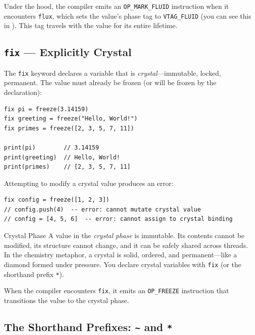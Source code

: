 Under the hood, the compiler emits an \lstinline|OP_MARK_FLUID| instruction when it encounters \lstinline|flux|, which sets the value's phase tag to \lstinline|VTAG_FLUID| (you can see this in ).
This tag travels with the value for its entire lifetime.

\subsection{\texttt{fix} --- Explicitly Crystal}\label{subsec:fix}

The \lstinline|fix| keyword declares a variable that is \emph{crystal}---immutable, locked, permanent.
The value must already be frozen (or will be frozen by the declaration):

\begin{lstlisting}[language=Lattice, caption={Declaring immutable variables with fix}]
fix pi = freeze(3.14159)
fix greeting = freeze("Hello, World!")
fix primes = freeze([2, 3, 5, 7, 11])

print(pi)        // 3.14159
print(greeting)  // Hello, World!
print(primes)    // [2, 3, 5, 7, 11]
\end{lstlisting}

Attempting to modify a crystal value produces an error:

\begin{lstlisting}[language=Lattice, caption={Crystal values reject modification}]
fix config = freeze([1, 2, 3])
// config.push(4)  -- error: cannot mutate crystal value
// config = [4, 5, 6]  -- error: cannot assign to crystal binding
\end{lstlisting}

\begin{defnbox}{Crystal Phase}
A value in the \emph{crystal phase} is immutable.
Its contents cannot be modified, its structure cannot change, and it can be safely shared across threads.
In the chemistry metaphor, a crystal is solid, ordered, and permanent---like a diamond formed under pressure.
You declare crystal variables with \lstinline|fix| (or the shorthand prefix \lstinline|*|).
\end{defnbox}

When the compiler encounters \lstinline|fix|, it emits an \lstinline|OP_FREEZE| instruction that transitions the value to the crystal phase.

\subsection{The Shorthand Prefixes: \texttt{\~{}} and \texttt{*}}\label{subsec:shorthand-prefixes}


